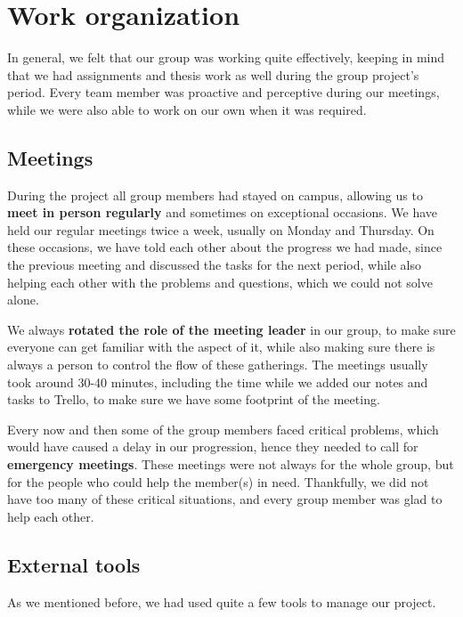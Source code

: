 \documentclass[a4paper, 11pt, article]{report}
\begin{document}

\chapter{Work organization}

In general, we felt that our group was working quite effectively, keeping in mind that we had assignments and thesis work as well during the group project's period. Every team member was proactive and perceptive during our meetings, while we were also able to work on our own when it was required.
   
\section{Meetings}

During the project all group members had stayed on campus, allowing us to \textbf{meet in person regularly} and sometimes on exceptional occasions. We have held our regular meetings twice a week, usually on Monday and Thursday. On these occasions, we have told each other about the progress we had made, since the previous meeting and discussed the tasks for the next period, while also helping each other with the problems and questions, which we could not solve alone.

We always \textbf{rotated the role of the meeting leader} in our group, to make sure everyone can get familiar with the aspect of it, while also making sure there is always a person to control the flow of these gatherings. The meetings usually took around 30-40 minutes, including the time while we added our notes and tasks to Trello, to make sure we have some footprint of the meeting.

Every now and then some of the group members faced critical problems, which would have caused a delay in our progression, hence they needed to call for \textbf{emergency meetings}. These meetings were not always for the whole group, but for the people who could help the member(s) in need. Thankfully, we did not have too many of these critical situations, and every group member was glad to help each other.
   
\section{External tools}

As we mentioned before, we had used quite a few tools to manage our project. 
\end{document}

